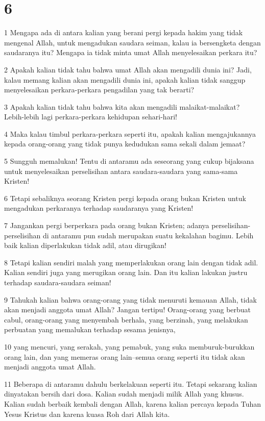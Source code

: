 \chapter{6}

\par 1 Mengapa ada di antara kalian yang berani pergi kepada hakim yang tidak mengenal Allah, untuk mengadukan saudara seiman, kalau ia bersengketa dengan saudaranya itu? Mengapa ia tidak minta umat Allah menyelesaikan perkara itu?
\par 2 Apakah kalian tidak tahu bahwa umat Allah akan mengadili dunia ini? Jadi, kalau memang kalian akan mengadili dunia ini, apakah kalian tidak sanggup menyelesaikan perkara-perkara pengadilan yang tak berarti?
\par 3 Apakah kalian tidak tahu bahwa kita akan mengadili malaikat-malaikat? Lebih-lebih lagi perkara-perkara kehidupan sehari-hari!
\par 4 Maka kalau timbul perkara-perkara seperti itu, apakah kalian mengajukannya kepada orang-orang yang tidak punya kedudukan sama sekali dalam jemaat?
\par 5 Sungguh memalukan! Tentu di antaramu ada seseorang yang cukup bijaksana untuk menyelesaikan perselisihan antara saudara-saudara yang sama-sama Kristen!
\par 6 Tetapi sebaliknya seorang Kristen pergi kepada orang bukan Kristen untuk mengadukan perkaranya terhadap saudaranya yang Kristen!
\par 7 Jangankan pergi berperkara pada orang bukan Kristen; adanya perselisihan-perselisihan di antaramu pun sudah merupakan suatu kekalahan bagimu. Lebih baik kalian diperlakukan tidak adil, atau dirugikan!
\par 8 Tetapi kalian sendiri malah yang memperlakukan orang lain dengan tidak adil. Kalian sendiri juga yang merugikan orang lain. Dan itu kalian lakukan justru terhadap saudara-saudara seiman!
\par 9 Tahukah kalian bahwa orang-orang yang tidak menuruti kemauan Allah, tidak akan menjadi anggota umat Allah? Jangan tertipu! Orang-orang yang berbuat cabul, orang-orang yang menyembah berhala, yang berzinah, yang melakukan perbuatan yang memalukan terhadap sesama jenisnya,
\par 10 yang mencuri, yang serakah, yang pemabuk, yang suka memburuk-burukkan orang lain, dan yang memeras orang lain--semua orang seperti itu tidak akan menjadi anggota umat Allah.
\par 11 Beberapa di antaramu dahulu berkelakuan seperti itu. Tetapi sekarang kalian dinyatakan bersih dari dosa. Kalian sudah menjadi milik Allah yang khusus. Kalian sudah berbaik kembali dengan Allah, karena kalian percaya kepada Tuhan Yesus Kristus dan karena kuasa Roh dari Allah kita.
